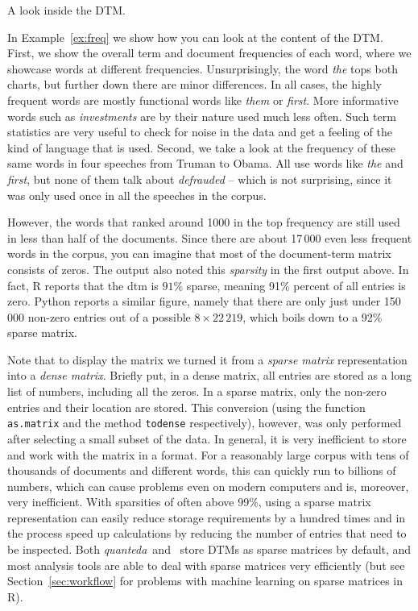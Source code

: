 \begin{ccsexample}
  \caption{A look inside the DTM.}\label{ex:freq}
\end{ccsexample}


In Example~\ref{ex:freq} we show how you can look at the content of the DTM. First, we show the overall term and document frequencies of each word, where we showcase words at different frequencies. Unsurprisingly, the word \emph{the} tops both charts, but further down there are minor differences.
In all cases, the highly frequent words are mostly functional words like \emph{them} or \emph{first}. More informative words such as \emph{investments} are by their nature used much less often.
Such term statistics are very useful to check for noise in the data and get a feeling of the kind of language that is used.
Second, we take a look at the frequency of these same words in four speeches from Truman to Obama. All use words like \emph{the} and \emph{first}, but none of them talk about \emph{defrauded} -- which is not surprising, since it was only used once in all the speeches in the corpus.

However, the words that ranked around 1000 in the top frequency are still used in less than half of the documents.
Since there are about 17\,000 even less frequent words in the corpus, you can imagine that most of the document-term matrix consists of zeros.
The output also noted this \emph{sparsity} in the first output above.
In fact, R reports that the dtm is $91\%$ sparse, meaning 91\% percent of all entries is zero.
Python reports a similar figure, namely that there are only just under 150\,000 non-zero entries
out of a possible $8\times22\,219$, which boils down to a 92\% sparse matrix.

Note that to display the matrix we turned it from a \emph{sparse matrix} representation into a \emph{dense matrix}.
Briefly put, in a dense matrix, all entries are stored as a long list of numbers, including all the zeros.
In a sparse matrix,  only the non-zero entries and their location are stored.
This conversion (using the function \verb|as.matrix| and the method \verb|todense| respectively), however, was only performed after selecting a small subset of the data.
In general,  it is very inefficient to store and work with the matrix in a  format.
For a reasonably large corpus with tens of thousands of documents and different words, this can quickly run to billions of numbers,
which can cause problems even on modern computers and is, moreover, very inefficient.
With sparsities of often above 99\%, using a sparse matrix representation can easily reduce storage requirements by  a hundred times and in the process speed up calculations by reducing the number of entries that need to be inspected.
Both \emph{quanteda}\ and \sklearn\ store DTMs as sparse matrices by default,
and most analysis tools are able to deal with sparse matrices very efficiently
(but see Section~\ref{sec:workflow} for problems with machine learning on sparse matrices in R).

